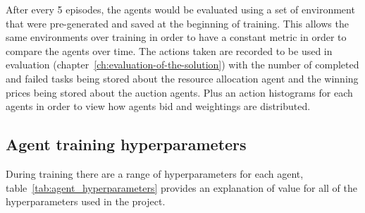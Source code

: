 After every 5 episodes, the agents would be evaluated using a set of environment that were pre-generated and
saved at the beginning of training. This allows the same environments over training in order to have a constant metric
in order to compare the agents over time. The actions taken are recorded to be used in evaluation
(chapter~\ref{ch:evaluation-of-the-solution}) with the number of completed and failed tasks being stored about
the resource allocation agent and the winning prices being stored about the auction agents. Plus an action histograms
for each agents in order to view how agents bid and weightings are distributed.

\subsection{Agent training hyperparameters}\label{subsec:agent-training-hyperparameters}
During training there are a range of hyperparameters for each agent, table~\ref{tab:agent_hyperparameters} provides
an explanation of value for all of the hyperparameters used in the project.

